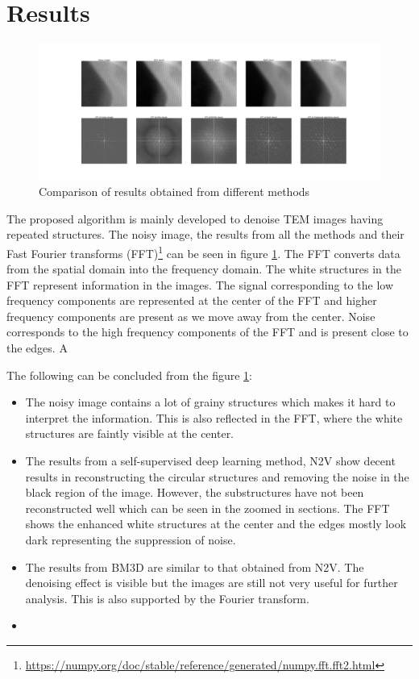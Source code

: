 \documentclass[fleqn,10pt]{wlscirep}
\begin{document}
\section*{Results}

\begin{figure}
	\centering
	\includegraphics[scale=0.1]{./imgs/comparison.jpg}
	\caption{Comparison of results obtained from different methods}
	\label{fig:comparison}
\end{figure}


The proposed algorithm is mainly developed to denoise TEM images having repeated structures. The noisy image, the results from all the methods and their Fast Fourier transforms (FFT)\footnote{\url{https://numpy.org/doc/stable/reference/generated/numpy.fft.fft2.html}} can be seen in figure \ref{fig:comparison}. The FFT converts data from the spatial domain into the frequency domain. The white structures in the FFT represent information in the images. The signal corresponding to the low frequency components are represented at the center of the FFT and higher frequency components are present as we move away from the center. Noise corresponds to the high frequency components of the FFT and is present close to the edges. A

The following can be concluded from the figure \ref{fig:comparison}:
\begin{itemize}
	\item The noisy image contains a lot of grainy structures which makes it hard to interpret the information. This is also reflected in the FFT, where the white structures are faintly visible at the center.
	
	\item The results from a self-supervised deep learning method, N2V\cite{krull2019noise2void} show decent results in reconstructing the circular structures and removing the noise in the black region of the image. However, the substructures have not been reconstructed well which can be seen in the zoomed in sections. The FFT shows the enhanced white structures at the center and the edges mostly look dark representing the suppression of noise. 
	
	\item The results from BM3D \cite{DBLP:journals/tip/BM3D} are similar to that obtained from N2V. The denoising effect is visible but the images are still not very useful for further analysis. This is also supported by the Fourier transform.
	
	\item 
\end{itemize}
\end{document}

